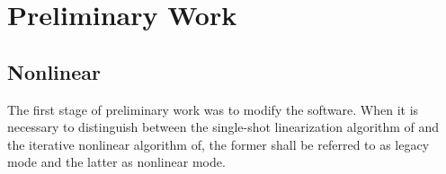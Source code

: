 \chapter{Preliminary Work}
\label{chap:prelim_work}

\section{Nonlinear \cobra}
\label{sect:nl_cobra}
The first stage of preliminary work was to modify the \cobra software.
\cobra 
When it is necessary to distinguish between the single-shot linearization algorithm of \cobra and the iterative nonlinear algorithm of\cobra, the former shall be referred to as legacy mode and the latter as nonlinear mode.

